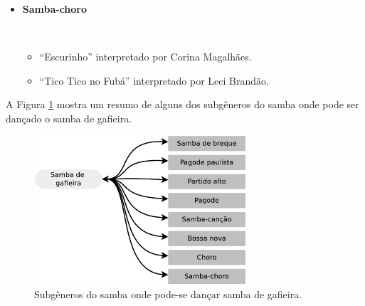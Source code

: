 \begin{itemize}
\item \textbf{Samba-choro}
\begin{example} ~
\begin{itemize}
\item ``Escurinho'' interpretado por Corina Magalhães.
\item ``Tico Tico no Fubá'' interpretado por Leci Brandão.
\end{itemize}
\end{example}

\end{itemize}

A Figura \ref{fig:gafieiradancaestilos} mostra um resumo de alguns dos 
subgêneros do samba onde pode ser dançado o samba de gafieira.
\begin{figure}[h]
  \centering
    \includegraphics[width=0.7\textwidth]{chapters/cap-historia-sambagafieira/gafieiravcmusica.eps}
  \caption{ Subgêneros do samba onde pode-se dançar samba de gafieira.}
\label{fig:gafieiradancaestilos}
\end{figure}

